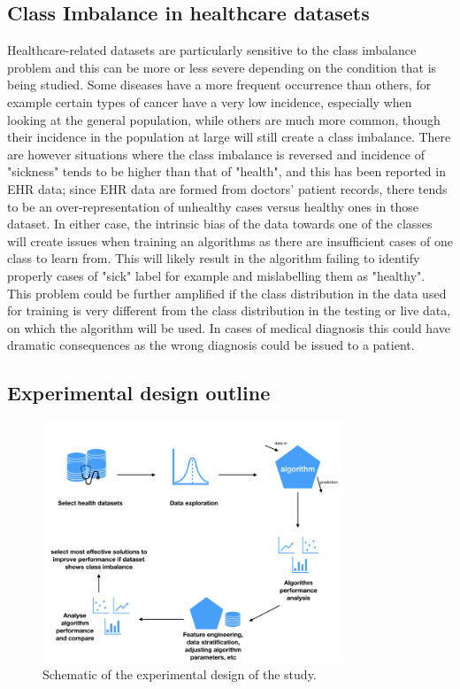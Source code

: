 \subsection{Class Imbalance in healthcare datasets}
Healthcare-related datasets are particularly sensitive to the class imbalance problem and this can be more or less severe depending on the condition that is being studied. Some diseases have a more frequent occurrence than others, for example certain types of cancer have a very low incidence, especially when looking at the general population, while others are much more common, though their incidence in the population at large will still create a class imbalance. There are however situations where the class imbalance is reversed and incidence of "sickness" tends to be higher than that of "health", and this has been reported in EHR data; since EHR data are formed from doctors' patient records, there tends to be an over-representation of unhealthy cases versus healthy ones in those dataset. In either case, the intrinsic bias of the data towards one of the classes will create issues when training an algorithms as there are insufficient cases of one class to learn from. This will likely result in the algorithm failing to identify properly cases of "sick" label for example and mislabelling them as "healthy". This problem could be further amplified if the class distribution in the data used for training is very different from the class distribution in the testing or live data, on which the algorithm will be used.
In cases of medical diagnosis this could have dramatic consequences as the wrong diagnosis could be issued to a patient. 


\subsection{Experimental design outline}


\begin{figure}[H]
    \centering
    \includegraphics[width=0.8\textwidth]{ThesisTemplate/usingLatex/images/Chapter3Figures001.jpeg}
    \caption{Schematic of the experimental design of the study.}
    \label{fig:expDesign}
\end{figure}

